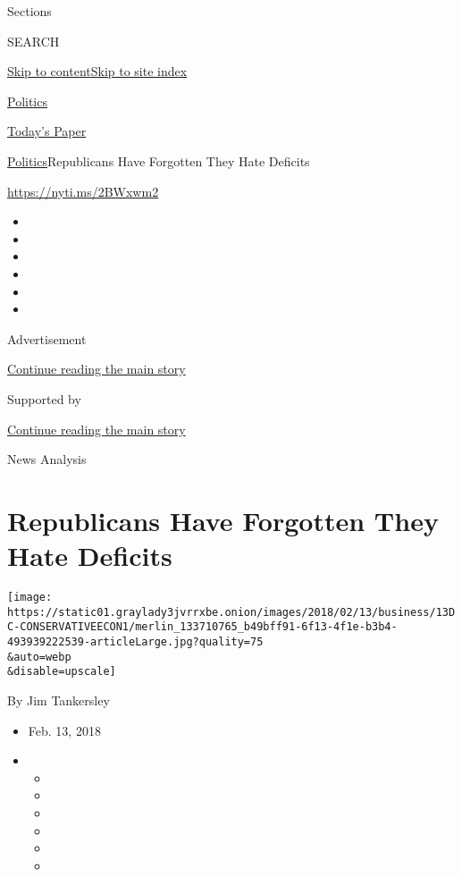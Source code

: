 Sections

SEARCH

\protect\hyperlink{site-content}{Skip to
content}\protect\hyperlink{site-index}{Skip to site index}

\href{https://www.nytimes3xbfgragh.onion/section/politics}{Politics}

\href{https://myaccount.nytimes3xbfgragh.onion/auth/login?response_type=cookie\&client_id=vi}{}

\href{https://www.nytimes3xbfgragh.onion/section/todayspaper}{Today's
Paper}

\href{/section/politics}{Politics}\textbar{}Republicans Have Forgotten
They Hate Deficits

\url{https://nyti.ms/2BWxwm2}

\begin{itemize}
\item
\item
\item
\item
\item
\item
\end{itemize}

Advertisement

\protect\hyperlink{after-top}{Continue reading the main story}

Supported by

\protect\hyperlink{after-sponsor}{Continue reading the main story}

News Analysis

\hypertarget{republicans-have-forgotten-they-hate-deficits}{%
\section{Republicans Have Forgotten They Hate
Deficits}\label{republicans-have-forgotten-they-hate-deficits}}

\texttt{[image: https://static01.graylady3jvrrxbe.onion/images/2018/02/13/business/13DC-CONSERVATIVEECON1/merlin\_133710765\_b49bff91-6f13-4f1e-b3b4-493939222539-articleLarge.jpg?quality=75\\\&auto=webp\\\&disable=upscale]}

By Jim Tankersley

\begin{itemize}
\item
  Feb. 13, 2018
\item
  \begin{itemize}
  \item
  \item
  \item
  \item
  \item
  \item
  \end{itemize}
\end{itemize}

